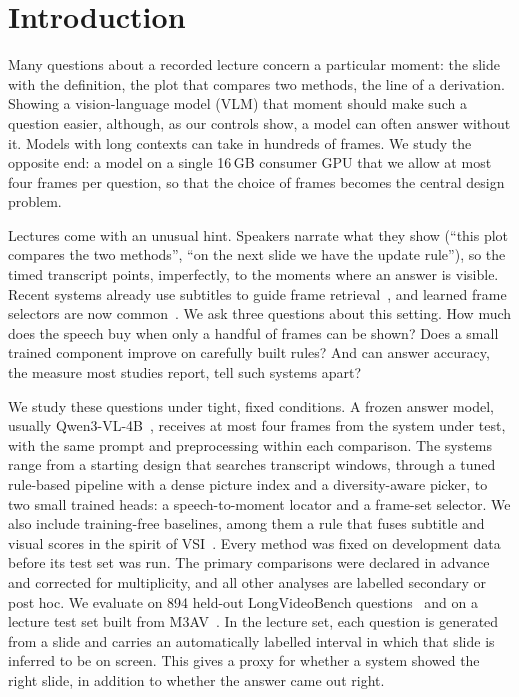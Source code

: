 \section{Introduction}
\label{sec:intro}

Many questions about a recorded lecture concern a particular moment: the slide with the definition, the plot that compares two methods, the line of a derivation.
Showing a vision-language model (VLM) that moment should make such a question easier, although, as our controls show, a model can often answer without it.
Models with long contexts can take in hundreds of frames.
We study the opposite end: a model on a single 16\,GB consumer GPU that we allow at most four frames per question, so that the choice of frames becomes the central design problem.

Lectures come with an unusual hint.
Speakers narrate what they show (``this plot compares the two methods'', ``on the next slide we have the update rule''), so the timed transcript points, imperfectly, to the moments where an answer is visible.
Recent systems already use subtitles to guide frame retrieval~\cite{he2025vsi,wei2026gcr}, and learned frame selectors are now common~\cite{yu2025framevoyager,hu2025mllm,buch2025flexible}.
We ask three questions about this setting.
How much does the speech buy when only a handful of frames can be shown?
Does a small trained component improve on carefully built rules?
And can answer accuracy, the measure most studies report, tell such systems apart?

We study these questions under tight, fixed conditions.
A frozen answer model, usually Qwen3-VL-4B~\cite{bai2025qwen3vl}, receives at most four frames from the system under test, with the same prompt and preprocessing within each comparison.
The systems range from a starting design that searches transcript windows, through a tuned rule-based pipeline with a dense picture index and a diversity-aware picker, to two small trained heads: a speech-to-moment locator and a frame-set selector.
We also include training-free baselines, among them a rule that fuses subtitle and visual scores in the spirit of VSI~\cite{he2025vsi}.
Every method was fixed on development data before its test set was run.
The primary comparisons were declared in advance and corrected for multiplicity, and all other analyses are labelled secondary or post hoc.
We evaluate on 894 held-out LongVideoBench questions~\cite{wu2024longvideobench} and on a lecture test set built from M3AV~\cite{chen2024m3av}.
In the lecture set, each question is generated from a slide and carries an automatically labelled interval in which that slide is inferred to be on screen.
This gives a proxy for whether a system showed the right slide, in addition to whether the answer came out right.

